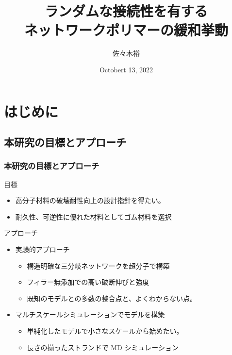 \documentclass[12pt, dvipdfmx]{beamer}
\title
[ランダムな接続性を有するネットワークポリマーの緩和挙動]
{ランダムな接続性を有する\\ネットワークポリマーの緩和挙動}
\author[東亞合成　佐々木]{佐々木裕}
\institute[東亞合成]{東亞合成}
\date{Octobert 13, 2022}
\begin{document}
\begin{frame}\frametitle{}
	\titlepage
\end{frame}

\section{はじめに}
\subsection{本研究の目標とアプローチ}
\begin{frame}
    \frametitle{本研究の目標とアプローチ}
        \begin{block}{目標}
                \begin{itemize}
                    \item 高分子材料の破壊耐性向上の設計指針を得たい。
                    \item 耐久性、可逆性に優れた材料としてゴム材料を選択
                \end{itemize}
        \end{block}
		\begin{exampleblock}{アプローチ}
            \begin{itemize}
                \item 実験的アプローチ
                \begin{itemize}
                    \item 構造明確な\alert{三分岐}ネットワークを超分子で構築
                    \item フィラー無添加での\alert{高い破断伸びと強度}
                    \item 既知のモデルとの多数の整合点と、\alert{よくわからない点}。
                \end{itemize}
                \item マルチスケールシミュレーションで\color{red}モデル\color{black}を構築
                \begin{itemize}
                    \item 単純化したモデルで小さなスケールから始めたい。
                    \item \alert{長さの揃ったストランドで MD シミュレーション}
                \end{itemize}
            \end{itemize}
		\end{exampleblock}
\end{frame}
\end{document}
